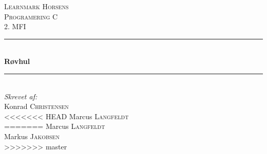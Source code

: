 \documentclass[a4paper, 12pt]{article}
\begin{document}
\begin{titlepage}

	\newcommand{\HRule}{\rule{\linewidth}{0.5mm}}

	\center


	\textsc{\LARGE Learnmark Horsens}\\[1.5cm] %
	\textsc{\Large Programering C}\\[0.5cm] %
	\textsc{\large 2. MFI}\\[0.5cm] %


	\HRule \\[0.4cm]
	{ \huge \bfseries Røvhul}\\[0.4cm]
	\HRule \\[1.5cm]


	\Large \emph{Skrevet af:}\\
	Konrad \textsc{Christensen}\\
<<<<<<< HEAD
	Marcus \textsc{Langfeldt}\\[3cm]
=======
	Marcus \textsc{Langfeldt}\\
	Markus \textsc{Jakobsen}\\[3cm]
>>>>>>> master

	\vfill

\end{titlepage}

\pagebreak


\tableofcontents

\vfill

\pagebreak

\end{document}
